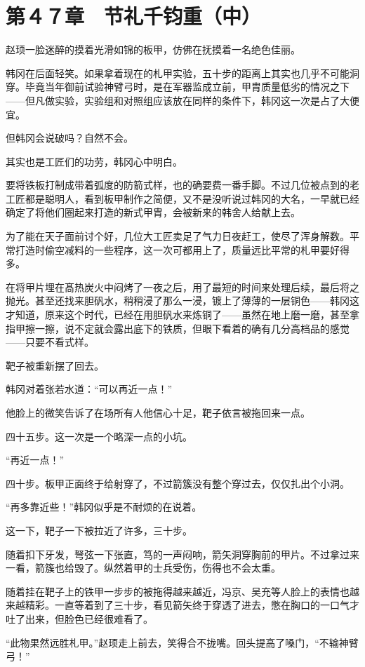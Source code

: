 \section{第４７章　节礼千钧重（中）}

赵顼一脸迷醉的摸着光滑如锦的板甲，仿佛在抚摸着一名绝色佳丽。

韩冈在后面轻笑。如果拿着现在的札甲实验，五十步的距离上其实也几乎不可能洞穿。毕竟当年御前试验神臂弓时，是在军器监成立前，甲胄质量低劣的情况之下——但凡做实验，实验组和对照组应该放在同样的条件下，韩冈这一次是占了大便宜。

但韩冈会说破吗？自然不会。

其实也是工匠们的功劳，韩冈心中明白。

要将铁板打制成带着弧度的防箭式样，也的确要费一番手脚。不过几位被点到的老工匠都是聪明人，看到板甲制作之简便，又不是没听说过韩冈的大名，一早就已经确定了将他们圈起来打造的新式甲胄，会被新来的韩舍人给献上去。

为了能在天子面前讨个好，几位大工匠卖足了气力日夜赶工，使尽了浑身解数。平常打造时偷空减料的一些程序，这一次可都用上了，质量远比平常的札甲要好得多。

在将甲片埋在髙热炭火中闷烤了一夜之后，用了最短的时间来处理后续，最后将之抛光。甚至还找来胆矾水，稍稍浸了那么一浸，镀上了薄薄的一层铜色——韩冈这才知道，原来这个时代，已经在用胆矾水来炼铜了——虽然在地上磨一磨，甚至拿指甲擦一擦，说不定就会露出底下的铁质，但眼下看着的确有几分高档品的感觉——只要不看式样。

靶子被重新摆了回去。

韩冈对着张若水道：“可以再近一点！”

他脸上的微笑告诉了在场所有人他信心十足，靶子依言被拖回来一点。

四十五步。这一次是一个略深一点的小坑。

“再近一点！”

四十步。板甲正面终于给射穿了，不过箭簇没有整个穿过去，仅仅扎出个小洞。

“再多靠近些！”韩冈似乎是不耐烦的在说着。

这一下，靶子一下被拉近了许多，三十步。

随着扣下牙发，弩弦一下张直，笃的一声闷响，箭矢洞穿胸前的甲片。不过拿过来一看，箭簇也给毁了。纵然着甲的士兵受伤，伤得也不会太重。

随着挂在靶子上的铁甲一步步的被拖得越来越近，冯京、吴充等人脸上的表情也越来越精彩。一直等着到了三十步，看见箭矢终于穿透了进去，憋在胸口的一口气才吐了出来，但脸色已经很难看了。

“此物果然远胜札甲。”赵顼走上前去，笑得合不拢嘴。回头提高了嗓门，“不输神臂弓！”

